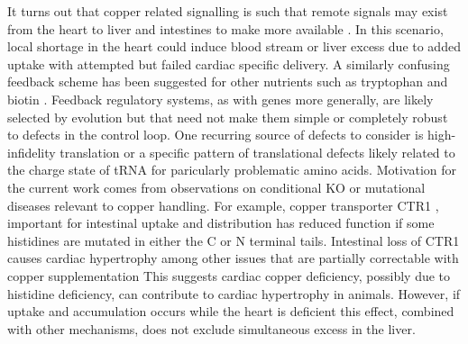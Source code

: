 {It turns out that copper related signalling is such that remote 
signals may exist from the heart
to liver and intestines to make more available
\cite{Kim_Turski_Nose_Cardiac_Copper_Deficiency_Activates_2010}
\cite{xxx_Mechanism_regulation_2010}. In this scenario, local
shortage in the heart could induce blood stream or liver excess 
due to added
uptake with attempted but failed   cardiac specific delivery.
A similarly confusing  feedback scheme 
has been suggested for other nutrients such as tryptophan
\cite{mmarchywka-MJM-2021-007-.1-table-rg}
and biotin
\cite{marchywka-MJM-2022-010-0.80}
\cite{marchywka-MJM-2021-015-0.50-rg}
.  Feedback  regulatory systems, as with genes more generally,  are likely 
selected by evolution but that need not make them simple
or  completely robust to defects in the control loop.
One recurring source of defects to consider is  high-infidelity
translation or a specific pattern of translational defects likely related
to the charge state of tRNA for paricularly problematic
amino acids.   
Motivation for the current work comes from observations on
conditional KO or mutational diseases relevant to copper handling. 
For example, copper transporter CTR1 , important for
intestinal uptake  
\cite{Nose_Kim_Thiele_Ctr1_drives_intestinal_copper_2006}
and distribution  
\cite{Lee_Prohaska_Thiele_Essential_role_mammalian_2001}
\cite{PMC9759326}
\cite{PMC34439}
has  reduced function  if some
histidines are mutated in either the C or N terminal tails. 
Intestinal loss of CTR1 causes cardiac hypertrophy
among other issues that are partially correctable with copper supplementation
\cite{Nose_Kim_Thiele_Ctr1_drives_intestinal_copper_2006}
This suggests cardiac copper deficiency, possibly due to histidine 
deficiency,  can contribute to  cardiac hypertrophy 
in animals.  However, if uptake and accumulation occurs
while the heart is deficient this effect,  combined
with other mechanisms,   does not exclude simultaneous excess in the liver.


}
